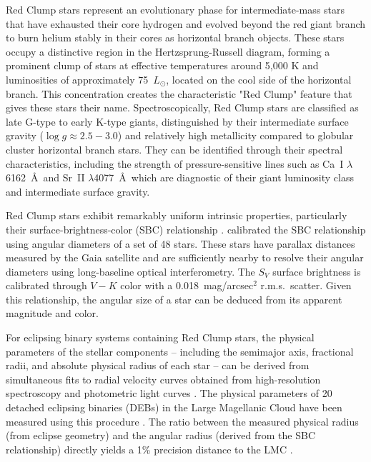 \documentclass[linenumbers,trackchanges]{aastex701}
\begin{document}
Red Clump stars represent an evolutionary phase for intermediate-mass stars 
that have exhausted their core hydrogen and evolved beyond the red giant branch to burn helium stably in their cores as horizontal branch objects. These stars occupy a distinctive region in the Hertzsprung-Russell diagram, forming a prominent clump of stars at effective temperatures around 5,000 K and luminosities of approximately 75~$L_\odot$, located on the cool side of the horizontal branch. This concentration creates the characteristic "Red Clump" feature that gives these stars their name.
Spectroscopically, Red Clump stars are classified as late G-type to early K-type giants, distinguished by their intermediate surface gravity ($\log g \approx 2.5-3.0$) and relatively high metallicity compared to globular cluster horizontal branch stars. They can be identified through their spectral characteristics, including the strength of pressure-sensitive lines such as Ca~I $\lambda$6162~\AA\  
and Sr~II $\lambda$4077~\AA\, which are diagnostic of their giant luminosity class and intermediate surface gravity. 


Red Clump stars exhibit remarkably uniform intrinsic properties, particularly their surface-brightness-color (SBC) relationship \citep{1969MNRAS.144..297W, 2019Natur.567..200P}.
\citet{2019Natur.567..200P} calibrated the SBC relationship using angular diameters of a set of 48 stars. These stars have parallax distances measured by the Gaia satellite \citep{2016A&A...595A...1G} and are sufficiently nearby to resolve their angular diameters using long-baseline optical interferometry. 
The $S_V$ surface brightness is calibrated through
$V-K$ color with a 0.018~mag/arcsec$^2$ r.m.s.\ scatter.
Given this relationship, the angular size of a star can be deduced from its apparent magnitude and color.

For eclipsing binary systems containing Red Clump stars, the physical parameters of the stellar components -- including the semimajor axis, fractional radii, and absolute physical radius of each star -- can be derived from simultaneous fits to radial velocity curves obtained from high-resolution spectroscopy and photometric light curves \citep{2012ApJ...750..144G}.
The physical parameters of 20 detached eclipsing binaries (DEBs) in the Large Magellanic Cloud have been measured using this procedure \citep{2018ApJ...860....1G}. 
The ratio between the measured physical radius (from eclipse geometry) and the angular radius (derived from the SBC relationship) directly yields a 1\% precision distance to the LMC \citep{2019Natur.567..200P}.
\end{document}
